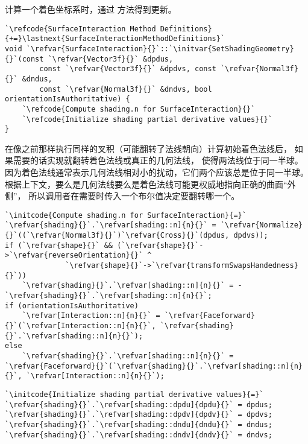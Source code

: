计算一个着色坐标系时，通过
方法得到更新。
\begin{lstlisting}
`\refcode{SurfaceInteraction Method Definitions}{+=}\lastnext{SurfaceInteractionMethodDefinitions}`
void `\refvar{SurfaceInteraction}{}`::`\initvar{SetShadingGeometry}{}`(const `\refvar{Vector3f}{}` &dpdus,
        const `\refvar{Vector3f}{}` &dpdvs, const `\refvar{Normal3f}{}` &dndus,
        const `\refvar{Normal3f}{}` &dndvs, bool orientationIsAuthoritative) {
    `\refcode{Compute shading.n for SurfaceInteraction}{}`
    `\refcode{Initialize shading partial derivative values}{}`
}
\end{lstlisting}

在像之前那样执行同样的叉积（可能翻转了法线朝向）计算初始着色法线后，
如果需要的话实现就翻转着色法线或真正的几何法线，
使得两法线位于同一半球。
因为着色法线通常表示几何法线相对小的扰动，它们两个应该总是位于同一半球。
根据上下文，要么是几何法线要么是着色法线可能更权威地指向正确的曲面“外侧”，
所以调用者在需要时传入一个布尔值决定要翻转哪一个。
\begin{lstlisting}
`\initcode{Compute shading.n for SurfaceInteraction}{=}`
`\refvar{shading}{}`.`\refvar[shading::n]{n}{}` = `\refvar{Normalize}{}`((`\refvar{Normal3f}{}`)`\refvar{Cross}{}`(dpdus, dpdvs));
if (`\refvar{shape}{}` && (`\refvar{shape}{}`->`\refvar{reverseOrientation}{}` ^
              `\refvar{shape}{}`->`\refvar{transformSwapsHandedness}{}`))
    `\refvar{shading}{}`.`\refvar[shading::n]{n}{}` = -`\refvar{shading}{}`.`\refvar[shading::n]{n}{}`;
if (orientationIsAuthoritative)
    `\refvar[Interaction::n]{n}{}` = `\refvar{Faceforward}{}`(`\refvar[Interaction::n]{n}{}`, `\refvar{shading}{}`.`\refvar[shading::n]{n}{}`);
else
    `\refvar{shading}{}`.`\refvar[shading::n]{n}{}` = `\refvar{Faceforward}{}`(`\refvar{shading}{}`.`\refvar[shading::n]{n}{}`, `\refvar[Interaction::n]{n}{}`);
\end{lstlisting}
\begin{lstlisting}
`\initcode{Initialize shading partial derivative values}{=}`
`\refvar{shading}{}`.`\refvar[shading::dpdu]{dpdu}{}` = dpdus;
`\refvar{shading}{}`.`\refvar[shading::dpdv]{dpdv}{}` = dpdvs;
`\refvar{shading}{}`.`\refvar[shading::dndu]{dndu}{}` = dndus;
`\refvar{shading}{}`.`\refvar[shading::dndv]{dndv}{}` = dndvs;
\end{lstlisting}

